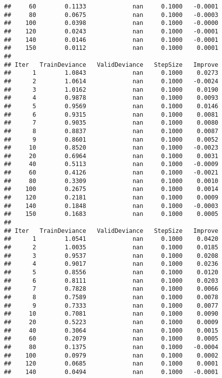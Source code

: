 \documentclass[]{article}
\begin{document}
\begin{verbatim}
##     60        0.1133             nan     0.1000   -0.0001
##     80        0.0675             nan     0.1000   -0.0003
##    100        0.0398             nan     0.1000   -0.0000
##    120        0.0243             nan     0.1000   -0.0001
##    140        0.0146             nan     0.1000   -0.0001
##    150        0.0112             nan     0.1000    0.0001
## 
## Iter   TrainDeviance   ValidDeviance   StepSize   Improve
##      1        1.0843             nan     0.1000    0.0273
##      2        1.0614             nan     0.1000   -0.0024
##      3        1.0162             nan     0.1000    0.0190
##      4        0.9878             nan     0.1000    0.0093
##      5        0.9569             nan     0.1000    0.0146
##      6        0.9315             nan     0.1000    0.0081
##      7        0.9035             nan     0.1000    0.0080
##      8        0.8837             nan     0.1000    0.0087
##      9        0.8601             nan     0.1000    0.0052
##     10        0.8520             nan     0.1000   -0.0023
##     20        0.6964             nan     0.1000    0.0031
##     40        0.5113             nan     0.1000   -0.0009
##     60        0.4126             nan     0.1000   -0.0021
##     80        0.3309             nan     0.1000    0.0010
##    100        0.2675             nan     0.1000    0.0014
##    120        0.2181             nan     0.1000    0.0009
##    140        0.1848             nan     0.1000   -0.0003
##    150        0.1683             nan     0.1000    0.0005
## 
## Iter   TrainDeviance   ValidDeviance   StepSize   Improve
##      1        1.0541             nan     0.1000    0.0420
##      2        1.0035             nan     0.1000    0.0185
##      3        0.9537             nan     0.1000    0.0208
##      4        0.9017             nan     0.1000    0.0236
##      5        0.8556             nan     0.1000    0.0120
##      6        0.8111             nan     0.1000    0.0203
##      7        0.7828             nan     0.1000    0.0066
##      8        0.7589             nan     0.1000    0.0078
##      9        0.7333             nan     0.1000    0.0077
##     10        0.7081             nan     0.1000    0.0090
##     20        0.5223             nan     0.1000    0.0009
##     40        0.3064             nan     0.1000    0.0015
##     60        0.2079             nan     0.1000    0.0005
##     80        0.1375             nan     0.1000   -0.0004
##    100        0.0979             nan     0.1000    0.0002
##    120        0.0685             nan     0.1000    0.0001
##    140        0.0494             nan     0.1000   -0.0001

\end{verbatim}
\end{document}
